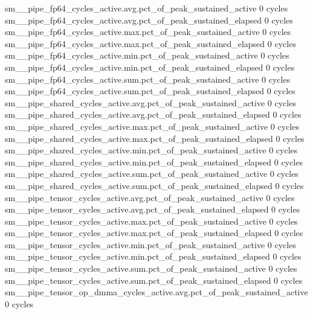 sm__pipe_fp64_cycles_active.avg.pct_of_peak_sustained_active                                   0 cycles
sm__pipe_fp64_cycles_active.avg.pct_of_peak_sustained_elapsed                                  0 cycles
sm__pipe_fp64_cycles_active.max.pct_of_peak_sustained_active                                   0 cycles
sm__pipe_fp64_cycles_active.max.pct_of_peak_sustained_elapsed                                  0 cycles
sm__pipe_fp64_cycles_active.min.pct_of_peak_sustained_active                                   0 cycles
sm__pipe_fp64_cycles_active.min.pct_of_peak_sustained_elapsed                                  0 cycles
sm__pipe_fp64_cycles_active.sum.pct_of_peak_sustained_active                                   0 cycles
sm__pipe_fp64_cycles_active.sum.pct_of_peak_sustained_elapsed                                  0 cycles
sm__pipe_shared_cycles_active.avg.pct_of_peak_sustained_active                                 0 cycles
sm__pipe_shared_cycles_active.avg.pct_of_peak_sustained_elapsed                                0 cycles
sm__pipe_shared_cycles_active.max.pct_of_peak_sustained_active                                 0 cycles
sm__pipe_shared_cycles_active.max.pct_of_peak_sustained_elapsed                                0 cycles
sm__pipe_shared_cycles_active.min.pct_of_peak_sustained_active                                 0 cycles
sm__pipe_shared_cycles_active.min.pct_of_peak_sustained_elapsed                                0 cycles
sm__pipe_shared_cycles_active.sum.pct_of_peak_sustained_active                                 0 cycles
sm__pipe_shared_cycles_active.sum.pct_of_peak_sustained_elapsed                                0 cycles
sm__pipe_tensor_cycles_active.avg.pct_of_peak_sustained_active                                 0 cycles
sm__pipe_tensor_cycles_active.avg.pct_of_peak_sustained_elapsed                                0 cycles
sm__pipe_tensor_cycles_active.max.pct_of_peak_sustained_active                                 0 cycles
sm__pipe_tensor_cycles_active.max.pct_of_peak_sustained_elapsed                                0 cycles
sm__pipe_tensor_cycles_active.min.pct_of_peak_sustained_active                                 0 cycles
sm__pipe_tensor_cycles_active.min.pct_of_peak_sustained_elapsed                                0 cycles
sm__pipe_tensor_cycles_active.sum.pct_of_peak_sustained_active                                 0 cycles
sm__pipe_tensor_cycles_active.sum.pct_of_peak_sustained_elapsed                                0 cycles
sm__pipe_tensor_op_dmma_cycles_active.avg.pct_of_peak_sustained_active                         0 cycles
